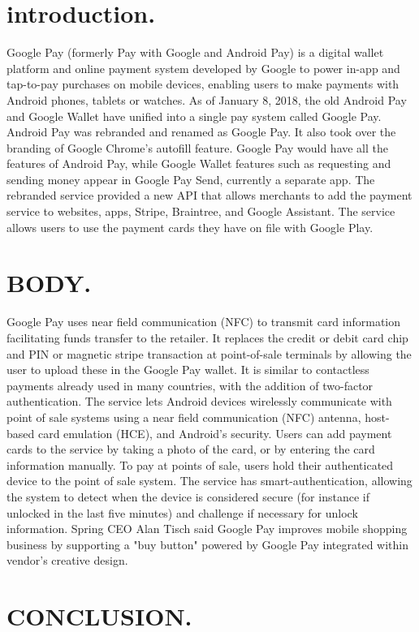 \documentclass[10pt,a4paper]{article}
\begin{document}
\section{introduction.}
Google Pay (formerly Pay with Google and Android Pay) is a digital wallet platform and online payment system developed by Google to power in-app and tap-to-pay purchases on mobile devices, enabling users to make payments with Android phones, tablets or watches. As of January 8, 2018, the old Android Pay and Google Wallet have unified into a single pay system called Google Pay. Android Pay was rebranded and renamed as Google Pay. It also took over the branding of Google Chrome's autofill feature. Google Pay would have all the features of Android Pay, while Google Wallet features such as requesting and sending money appear in Google Pay Send, currently a separate app.
The rebranded service provided a new API that allows merchants to add the payment service to websites, apps, Stripe, Braintree, and Google Assistant. The service allows users to use the payment cards they have on file with Google Play.


\section{BODY.}
Google Pay uses near field communication (NFC) to transmit card information facilitating funds transfer to the retailer. It replaces the credit or debit card chip and PIN or magnetic stripe transaction at point-of-sale terminals by allowing the user to upload these in the Google Pay wallet. It is similar to contactless payments already used in many countries, with the addition of two-factor authentication. The service lets Android devices wirelessly communicate with point of sale systems using a near field communication (NFC) antenna, host-based card emulation (HCE), and Android's security.
Users can add payment cards to the service by taking a photo of the card, or by entering the card information manually. To pay at points of sale, users hold their authenticated device to the point of sale system. The service has smart-authentication, allowing the system to detect when the device is considered secure (for instance if unlocked in the last five minutes) and challenge if necessary for unlock information. Spring CEO Alan Tisch said Google Pay improves mobile shopping business by supporting a "buy button" powered by Google Pay integrated within vendor's creative design.

\section{CONCLUSION.}



\end{document}
